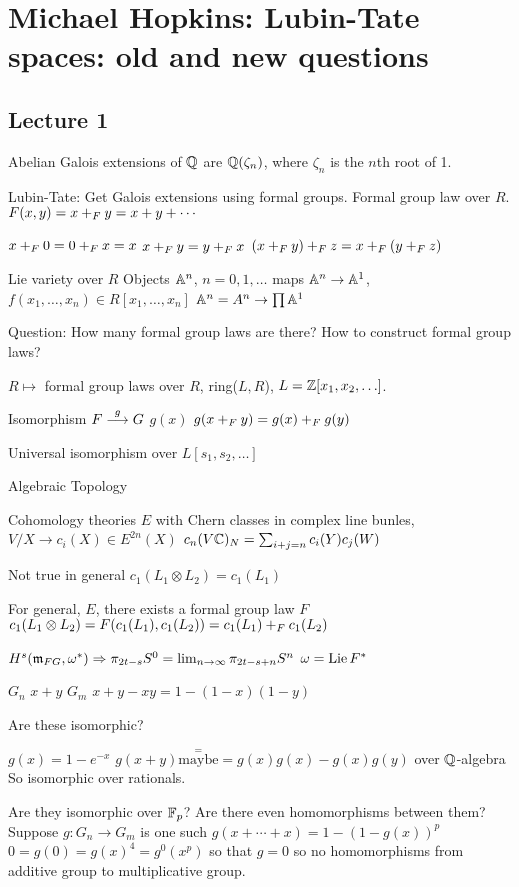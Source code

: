 \newpage
\section{Michael Hopkins: Lubin-Tate spaces: old and new questions}
\subsection{Lecture 1}

Abelian Galois extensions of $\mathbb{Q}$ are $\mathbb{Q}(\zeta_n)$, where $\zeta_n$ is the $n$th root of 1.

Lubin-Tate: Get Galois extensions using formal groups. Formal group law over $R$. $F(x,y)= x+_F y= x + y + \cdots$

$x+_F 0 = 0+_F x= x$
$x+_F y= y +_F x$
$(x +_F y) +_F z = x +_F (y +_F z)$

Lie variety over $R$
Objects $\mathbb{A}^n$, $n= 0,1,\ldots$
maps $\mathbb{A}^n \to \mathbb{A}^1$, $f(x_1,\ldots,x_n) \in R[x_1,\ldots,x_n]$
$\mathbb{A}^n= A^n \to \prod \mathbb{A}^1$ 


Question: How many formal group laws are there? How to construct formal group laws?

\begin{thm}[Lazard]
$R \mapsto$ formal group laws over $R$, ring($L,R$), $L= \mathbb{Z}[x_1,x_2,\ldots]$.
\end{thm}

Isomorphism $F \stackrel{g}{\longrightarrow} G$
$g(x)$
$g(x +_F y)= g(x) +_F g(y)$

Universal isomorphism over $L[s_1,s_2,\ldots]$



Algebraic Topology

Cohomology theories $E$ with Chern classes in complex line bunles,
$V /X \to c_i(X) \in E^{2n}(X)$
$c_n(V\mathbb{C})_N= \sum_{i+j=n} c_i(Y) c_j(W)$

Not true in general $c_1(L_1 \otimes L_2)= c_1(L_1)$


\begin{thm}[Quillen]
For general, $E$, there exists a formal group law $F$
$c_1(L_1 \otimes L_2)= F(c_1(L_1),c_1(L_2))= c_1(L_1) +_F c_1(L_2)$
\end{thm}

$H^s(\mathfrak{m}_{FG}, \omega^*) \Rightarrow \pi_{2t-s}S^0= \lim_{n \to \infty} \pi_{2t-s+n} S^n$
$\omega= \operatorname{Lie} F^*$



\begin{ex}
$G_n$ $x+y$
$G_m$ $x+y-xy= 1-(1-x)(1-y)$

Are these isomorphic?

$g(x)= 1 - e^{-x}$
$g(x+y) \stackrel{=}{\text{maybe}}= g(x)g(x) - g(x)g(y)$
over $\mathbb{Q}$-algebra
So isomorphic over rationals.

Are they isomorphic over $\mathbb{F}_p$? Are there even homomorphisms between them?
Suppose $g: G_n \to G_m$ is one such
$g(x+\cdots+x)= 1-(1- g(x))^p$
$0= g(0)= g(x)^4= g^0(x^p)$ so that $g=0$ so no homomorphisms from additive group to multiplicative group. 
\end{ex}


